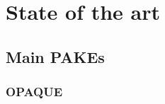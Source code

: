 \documentclass[../report.tex]{subfiles}
\begin{document}





\chapter{State of the art}
\section{Main PAKEs}

\subsection{OPAQUE}






\end{document}
